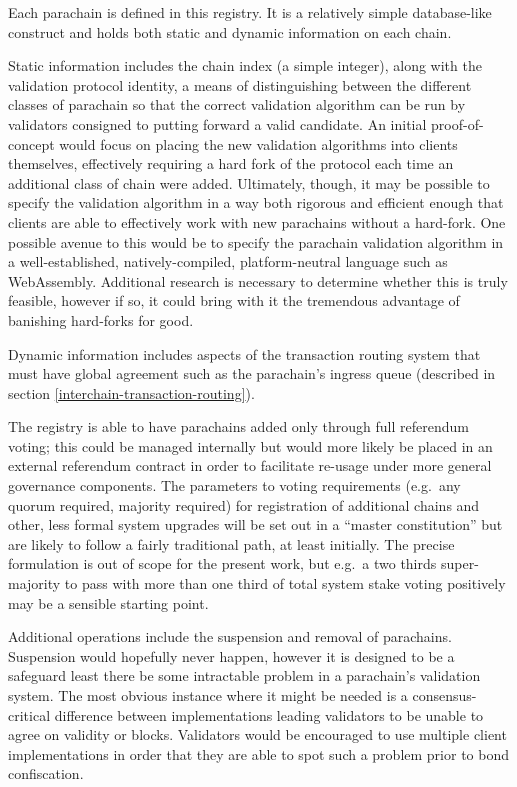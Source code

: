\documentclass[9pt,oneside]{amsart}
\makeatletter
\newcommand*\eg{e.g.\@\xspace}
\makeatother
\begin{document}
\begin{multicols}{2}
 Each parachain is defined in this registry. It is a relatively simple database-like construct and holds both static and dynamic information on each chain.

 Static information includes the chain index (a simple integer), along with the validation protocol identity, a means of distinguishing between the different classes of parachain so that the correct validation algorithm can be run by validators consigned to putting forward a valid candidate. An initial proof-of-concept would focus on placing the new validation algorithms into clients themselves, effectively requiring a hard fork of the protocol each time an additional class of chain were added. Ultimately, though, it may be possible to specify the validation algorithm in a way both rigorous and efficient enough that clients are able to effectively work with new parachains without a hard-fork. One possible avenue to this would be to specify the parachain validation algorithm in a well-established, natively-compiled, platform-neutral language such as WebAssembly. Additional research is necessary to determine whether this is truly feasible, however if so, it could bring with it the tremendous advantage of banishing hard-forks for good.

 Dynamic information includes aspects of the transaction routing system that must have global agreement such as the parachain's ingress queue (described in section \ref{interchain-transaction-routing}).

 The registry is able to have parachains added only through full referendum voting; this could be managed internally but would more likely be placed in an external referendum contract in order to facilitate re-usage under more general governance components. The parameters to voting requirements (\eg~any quorum required, majority required) for registration of additional chains and other, less formal system upgrades will be set out in a ``master constitution'' but are likely to follow a fairly traditional path, at least initially. The precise formulation is out of scope for the present work, but \eg~a two thirds super-majority to pass with more than one third of total system stake voting positively may be a sensible starting point.

 Additional operations include the suspension and removal of parachains. Suspension would hopefully never happen, however it is designed to be a safeguard least there be some intractable problem in a parachain's validation system. The most obvious instance where it might be needed is a consensus-critical difference between implementations leading validators to be unable to agree on validity or blocks. Validators would be encouraged to use multiple client implementations in order that they are able to spot such a problem prior to bond confiscation.


\end{multicols}
\end{document}
